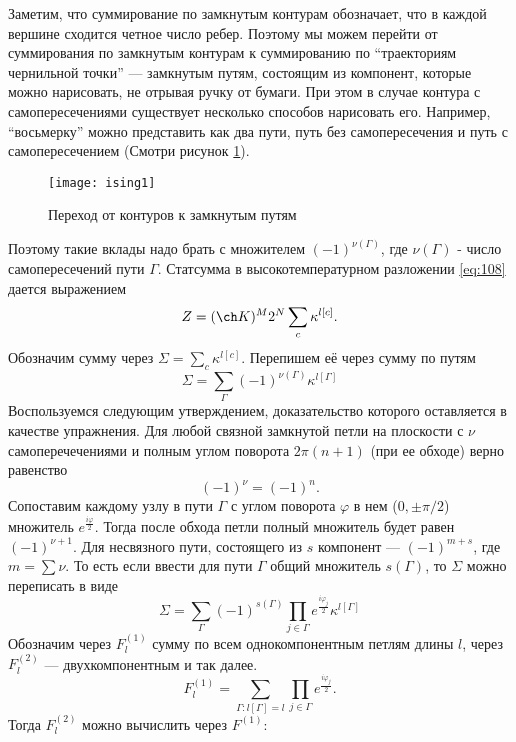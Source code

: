 \documentclass[a4paper,12pt]{article} \usepackage[utf8x]{inputenc} \usepackage[russian]{babel}
\theoremstyle{definition} \newtheorem{corollary}{Corollary}[theorem] \theoremstyle{definition}
\begin{document}
Заметим, что суммирование по замкнутым контурам обозначает, что в каждой вершине сходится четное
число ребер. Поэтому мы можем перейти от суммирования по замкнутым контурам к суммированию по
``траекториям чернильной точки'' --- замкнутым путям, состоящим из компонент, которые можно
нарисовать, не отрывая ручку от бумаги. При этом в случае контура с самопересечениями существует
несколько способов нарисовать его. Например, ``восьмерку'' можно представить как два пути, путь без
самопересечения и путь с самопересечением (Смотри рисунок \ref{fig:ising-1}).
\begin{figure}[h!tb] \centering
    \texttt{[image: ising1]}
  \caption{Переход от контуров к замкнутым путям}
  \label{fig:ising-1}
\end{figure} Поэтому такие вклады надо брать с множителем $(-1)^{\nu(\Gamma)}$, где $\nu(\Gamma)$ -
число самопересечений пути $\Gamma$. Статсумма в высокотемпературном разложении \eqref{eq:108}
дается выражением
\begin{equation}
  \label{eq:113} Z=(\ch K)^M 2^N\sum_c \kappa^{l[c]}.
\end{equation} Обозначим сумму через $\Sigma=\sum_c \kappa^{l[c]}$. Перепишем её через сумму по
путям
\begin{equation}
  \label{eq:114} \Sigma=\sum_{\Gamma}(-1)^{\nu(\Gamma)} \kappa^{l[\Gamma]}
\end{equation} Воспользуемся следующим утверждением, доказательство которого оставляется в качестве
упражнения. Для любой связной замкнутой петли на плоскости с $\nu$ самоперечечениями и полным углом
поворота $2\pi(n+1)$ (при ее обходе) верно равенство
\begin{equation}
  \label{eq:115} (-1)^{\nu}=(-1)^n.
\end{equation} Сопоставим каждому узлу в пути $\Gamma$ с углом поворота $\varphi$ в нем ($0,\pm
\pi/2$) множитель $e^{\frac{i\varphi}{2}}$. Тогда после обхода петли полный множитель будет равен
$(-1)^{\nu+1}$. Для несвязного пути, состоящего из $s$ компонент --- $(-1)^{m+s}$, где $m=\sum \nu$.
То есть если ввести для пути $\Gamma$ общий множитель $s(\Gamma)$, то $\Sigma$ можно переписать в
виде
\begin{equation}
  \label{eq:116} \Sigma=\sum_{\Gamma}(-1)^{s(\Gamma)}\prod_{j\in \Gamma}
e^{\frac{i\varphi_j}{2}}\kappa^{l[\Gamma]}
\end{equation} Обозначим через $F^{(1)}_l$ сумму по всем однокомпонентным петлям длины $l$, через
$F^{(2)}_l$ --- двухкомпонентным и так далее.
\begin{equation}
  \label{eq:117} F^{(1)}_l=\sum_{\Gamma:l[\Gamma]=l} \prod_{j\in \Gamma} e^{\frac{i\varphi_j}{2}}.
\end{equation} Тогда $F_l^{(2)}$ можно вычислить через $F^{(1)}$:
\end{document}
